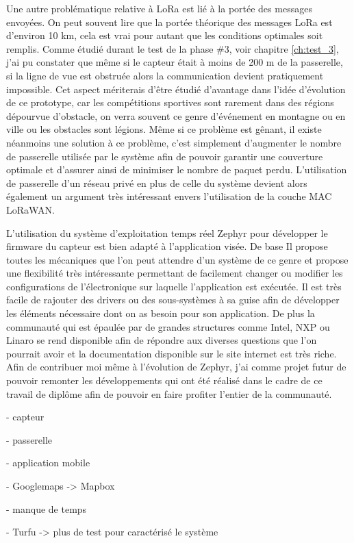 Une autre problématique relative à LoRa est lié à la portée des messages envoyées. On peut souvent lire que la portée théorique des messages LoRa est d'environ 10 km, cela est vrai pour autant que les conditions optimales soit remplis. Comme étudié durant le test de la phase \#3, voir chapitre \ref{ch:test_3}, j'ai pu constater que même si le capteur était à moins de 200 m de la passerelle, si la ligne de vue est obstruée alors la communication devient pratiquement impossible. Cet aspect mériterais d'être étudié d'avantage dans l'idée d'évolution de ce prototype, car les compétitions sportives sont rarement dans des régions dépourvue d'obstacle, on verra souvent ce genre d'événement en montagne ou en ville ou les obstacles sont légions. Même si ce problème est gênant, il existe néanmoins une solution à ce problème, c'est simplement d'augmenter le nombre de passerelle utilisée par le système afin de pouvoir garantir une couverture optimale et d'assurer ainsi de minimiser le nombre de paquet perdu. L'utilisation de passerelle d'un réseau privé en plus de celle du système devient alors également un argument très intéressant envers l'utilisation de la couche MAC LoRaWAN.

 L'utilisation du système d'exploitation temps réel Zephyr pour développer le firmware du capteur est bien adapté à l'application visée. De base Il propose toutes les mécaniques que l'on peut attendre d'un système de ce genre et propose une flexibilité très intéressante permettant de facilement changer ou modifier les configurations de l'électronique sur laquelle l'application est exécutée. Il est très facile de rajouter des drivers ou des sous-systèmes à sa guise afin de développer les éléments nécessaire dont on as besoin pour son application. De plus la communauté qui est épaulée par de grandes structures comme Intel, NXP ou Linaro se rend disponible afin de répondre aux diverses questions que l'on pourrait avoir et la documentation disponible sur le site internet est très riche. Afin de contribuer moi même à l'évolution de Zephyr, j'ai comme projet futur de pouvoir remonter les développements qui ont été réalisé dans le cadre de ce travail de diplôme afin de pouvoir en faire profiter l'entier de la communauté.








- capteur

- passerelle

- application mobile

- Googlemaps -> Mapbox

- manque de temps

- Turfu -> plus de test pour caractérisé le système